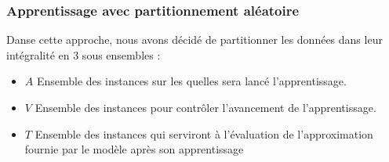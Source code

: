 \subsubsection{Apprentissage avec partitionnement aléatoire}\label{randomPartLearning}
Danse cette approche, nous avons décidé de partitionner les données dans leur intégralité en 3 sous ensembles : 
\begin{itemize}
	\item $A$ Ensemble des instances sur les quelles sera lancé l'apprentissage.
	\item $V$ Ensemble des instances pour contrôler l'avancement de l'apprentissage.
	\item $T$ Ensemble des instances qui serviront à l'évaluation de l'approximation fournie par le modèle après son apprentissage 
\end{itemize}

